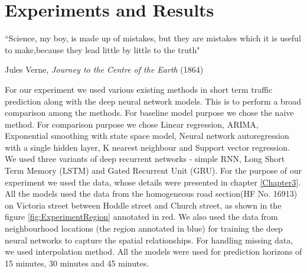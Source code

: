 
\chapter{Experiments and Results} %

\label{Chapter5} %


``Science, my boy, is made up of mistakes, but they are mistakes which it is useful to make,because
they lead little by little to the truth"

\begin{flushright}
Jules Verne, \textit{Journey to the Centre of the Earth} (1864)
\end{flushright}


For our experiment we used various existing methods in short term traffic prediction along with the
deep neural network models. This is to perform a broad comparison among the methods. For
baseline model purpose we chose the naive method. For comparison purpose we chose Linear regression, ARIMA,
Exponential smoothing with state space model, Neural network autoregression with a single hidden layer, K nearest
neighbour and Support vector regression. We used three variants of deep recurrent networks - simple
RNN, Long Short Term Memory (LSTM) and Gated Recurrent Unit (GRU). For the purpose of our experiment we used the data, whose
details were presented in chapter \ref{Chapter3}. All the models used the data from the homogeneous road
section(HF No. 16913) on Victoria street between Hoddle street and Church street, as shown in the
figure \ref{fig:ExperimentRegion} annotated in red. We also used the data from neighbourhood locations
(the region annotated in blue) for training the deep neural networks to capture the spatial relationships.
For handling missing data, we used interpolation method. All the models were used for prediction
horizons of 15 minutes, 30 minutes and 45 minutes.


